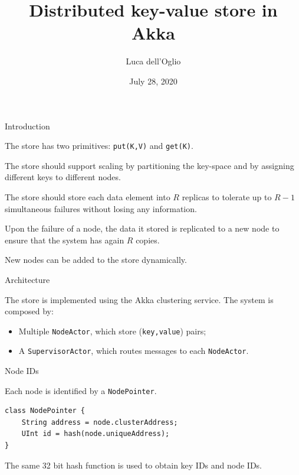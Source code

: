 \documentclass{beamer}
\title{Distributed key-value store in Akka}
\date{July 28, 2020}
\author{Luca dell'Oglio}
\institute{MTDS course, Politecnico di Milano}
\begin{document}
\setcounter{framenumber}{-1}

\begin{frame}[plain]
    \titlepage
\end{frame}

\begin{frame}{Introduction} \justify

    The store has two primitives: \texttt{put(K,V)} and \texttt{get(K)}.
    
    The store should support scaling by partitioning the key-space and by assigning different keys to different nodes.

    The store should store each data element into $R$ replicas to tolerate up to $R-1$ simultaneous failures without losing any information.
    
    Upon the failure of a node, the data it stored is replicated to a new node to ensure that the system has again $R$ copies.
 
    New nodes can be added to the store dynamically.
\end{frame}

\begin{frame}{Architecture} \justify
    
    The store is implemented using the Akka clustering service. The system is composed by:

    \begin{itemize}[label=$\bullet$]
        \item Multiple \texttt{NodeActor}, which store (\texttt{key,value}) pairs;
        \item A \texttt{SupervisorActor}, which routes messages to each \texttt{NodeActor}.
    \end{itemize}

\end{frame}

\begin{frame}[fragile]{Node IDs} \justify
    
    Each node is identified by a \texttt{NodePointer}.

    \begin{lstlisting}[escapechar=\°]
class NodePointer {
    String address = node.clusterAddress;
    UInt id = hash(node.uniqueAddress);
}
    \end{lstlisting}

The same 32 bit hash function is used to obtain key IDs and node IDs.

\end{frame}
\end{document}
